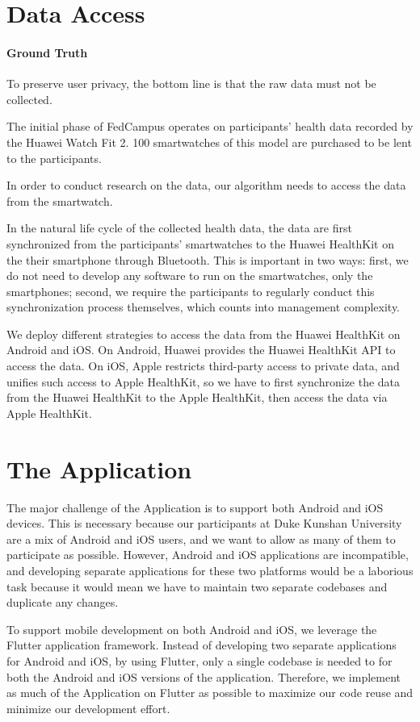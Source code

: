 \section{Data Access}

\paragraph{Ground Truth}
To preserve user privacy,
the bottom line is that the raw data must not be collected.

The initial phase of FedCampus operates on participants' health data recorded by
the Huawei Watch Fit 2.
100 smartwatches of this model are purchased to be lent to the participants.

In order to conduct research on the data,
our algorithm needs to access the data from the smartwatch.

In the natural life cycle of the collected health data,
the data are first synchronized from the participants' smartwatches to
the Huawei HealthKit on the their smartphone through Bluetooth.
This is important in two ways:
first, we do not need to develop any software to run on the smartwatches,
only the smartphones; second,
we require the participants to regularly conduct this synchronization process
themselves, which counts into management complexity.

We deploy different strategies to access the data from the Huawei HealthKit on
Android and iOS.
On Android, Huawei provides the Huawei HealthKit API to access the data.
On iOS, Apple restricts third-party access to private data,
and unifies such access to Apple HealthKit,
so we have to first synchronize the data from the Huawei HealthKit to
the Apple HealthKit, then access the data via Apple HealthKit.

\section{The \fedcampus Application}

The major challenge of the \fedcampus Application is to
support both Android and iOS devices.
This is necessary because our participants at Duke Kunshan University are
a mix of Android and iOS users,
and we want to allow as many of them to participate as possible.
However, Android and iOS applications are incompatible,
and developing separate applications for these two platforms would be
a laborious task because
it would mean we have to maintain two separate codebases and
duplicate any changes.

To support mobile development on both Android and iOS,
we leverage the Flutter application framework.
Instead of developing two separate applications for Android and iOS,
by using Flutter,
only a single codebase is needed to for both the Android and iOS versions of
the application.
Therefore, we implement as much of the \fedcampus Application on Flutter as
possible to maximize our code reuse and minimize our development effort.
